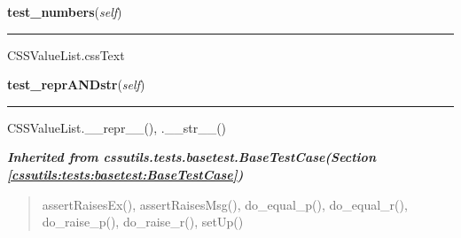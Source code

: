     \label{cssutils:tests:test_cssvalue:CSSValueListTestCase:test_numbers}

    \vspace{0.5ex}

\hspace{.8\funcindent}\begin{boxedminipage}{\funcwidth}

    \raggedright \textbf{test\_numbers}(\textit{self})

    \vspace{-1.5ex}

    \rule{\textwidth}{0.5\fboxrule}
\setlength{\parskip}{2ex}
    CSSValueList.cssText

\setlength{\parskip}{1ex}
    \end{boxedminipage}

    \label{cssutils:tests:test_cssvalue:CSSValueListTestCase:test_reprANDstr}

    \vspace{0.5ex}

\hspace{.8\funcindent}\begin{boxedminipage}{\funcwidth}

    \raggedright \textbf{test\_reprANDstr}(\textit{self})

    \vspace{-1.5ex}

    \rule{\textwidth}{0.5\fboxrule}
\setlength{\parskip}{2ex}
    CSSValueList.\_\_repr\_\_(), .\_\_str\_\_()

\setlength{\parskip}{1ex}
    \end{boxedminipage}


\large{\textbf{\textit{Inherited from cssutils.tests.basetest.BaseTestCase\textit{(Section \ref{cssutils:tests:basetest:BaseTestCase})}}}}

\begin{quote}
assertRaisesEx(), assertRaisesMsg(), do\_equal\_p(), do\_equal\_r(), do\_raise\_p(), do\_raise\_r(), setUp()
\end{quote}

